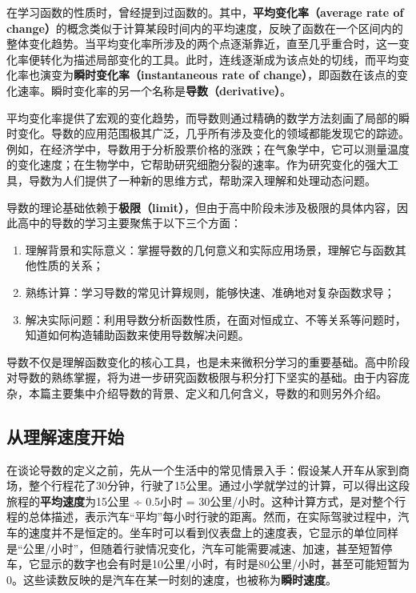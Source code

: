 

在学习函数的性质时，曾经提到过函数的。其中，\textbf{平均变化率（average rate of change）}的概念类似于计算某段时间内的平均速度，反映了函数在一个区间内的整体变化趋势。当平均变化率所涉及的两个点逐渐靠近，直至几乎重合时，这一变化率便转化为描述局部变化的工具。此时，连线逐渐成为该点处的切线，而平均变化率也演变为\textbf{瞬时变化率（instantaneous rate of change）}，即函数在该点的变化速率。瞬时变化率的另一个名称是\textbf{导数（derivative）}。

平均变化率提供了宏观的变化趋势，而导数则通过精确的数学方法刻画了局部的瞬时变化。导数的应用范围极其广泛，几乎所有涉及变化的领域都能发现它的踪迹。例如，在经济学中，导数用于分析股票价格的涨跌；在气象学中，它可以测量温度的变化速度；在生物学中，它帮助研究细胞分裂的速率。作为研究变化的强大工具，导数为人们提供了一种新的思维方式，帮助深入理解和处理动态问题。

导数的理论基础依赖于\textbf{极限（limit）}，但由于高中阶段未涉及极限的具体内容，因此高中的导数的学习主要聚焦于以下三个方面：
\begin{enumerate}
\item 理解背景和实际意义：掌握导数的几何意义和实际应用场景，理解它与函数其他性质的关系；
\item 熟练计算：学习导数的常见计算规则，能够快速、准确地对复杂函数求导；
\item 解决实际问题：利用导数分析函数性质，在面对恒成立、不等关系等问题时，知道如何构造辅助函数来使用导数解决问题。
\end{enumerate}

导数不仅是理解函数变化的核心工具，也是未来微积分学习的重要基础。高中阶段对导数的熟练掌握，将为进一步研究函数极限与积分打下坚实的基础。由于内容庞杂，本篇主要集中介绍导数的背景、定义和几何含义，导数的和则另外介绍。

\subsection{从理解速度开始}

在谈论导数的定义之前，先从一个生活中的常见情景入手：假设某人开车从家到商场，整个行程花了30分钟，行驶了15公里。通过小学就学过的计算，可以得出这段旅程的\textbf{平均速度}为15公里 ÷ 0.5小时 = 30公里/小时。这种计算方式，是对整个行程的总体描述，表示汽车“平均”每小时行驶的距离。然而，在实际驾驶过程中，汽车的速度并不是恒定的。坐车时可以看到仪表盘上的速度表，它显示的单位同样是“公里/小时”，但随着行驶情况变化，汽车可能需要减速、加速，甚至短暂停车，它显示的数字也会有时是10公里/小时，有时是80公里/小时，甚至可能短暂为0。这些读数反映的是汽车在某一时刻的速度，也被称为\textbf{瞬时速度}。

